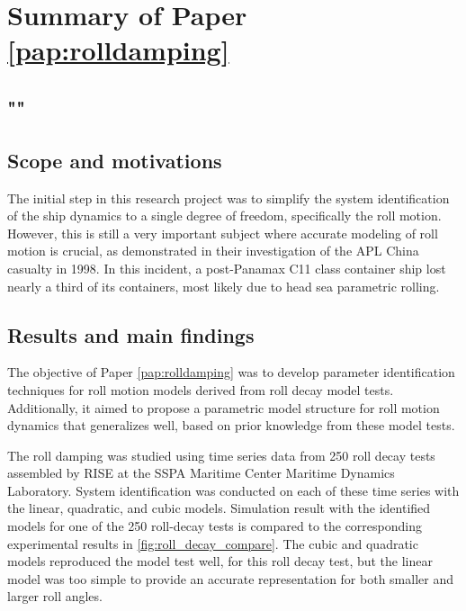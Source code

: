 \section{Summary of Paper \ref{pap:rolldamping}}
\subsection*{""}
\subsection*{Scope and motivations}
The initial step in this research project was to simplify the system identification of the ship dynamics to a single degree of freedom, specifically the roll motion. However, this is still a very important subject where accurate modeling of roll motion is crucial, as \textcite{franceInvestigationHeadSeaParametric2001} demonstrated in their investigation of the APL China casualty in 1998. In this incident, a post-Panamax C11 class container ship lost nearly a third of its containers, most likely due to head sea parametric rolling.

\subsection*{Results and main findings}
The objective of Paper \ref{pap:rolldamping} was to develop parameter identification techniques for roll motion models derived from roll decay model tests. Additionally, it aimed to propose a parametric model structure for roll motion dynamics that generalizes well, based on prior knowledge from these model tests.

The roll damping was studied using time series data from 250 roll decay tests assembled by RISE at the SSPA Maritime Center Maritime Dynamics Laboratory.
System identification was conducted on each of these time series with the linear, quadratic, and cubic models. Simulation result with the identified models for one of the 250 roll-decay tests is compared to the corresponding experimental results in \autoref{fig:roll_decay_compare}. The cubic and quadratic models reproduced the model test well, for this roll decay test, but the linear model was too simple to provide an accurate representation for both smaller and larger roll angles.

